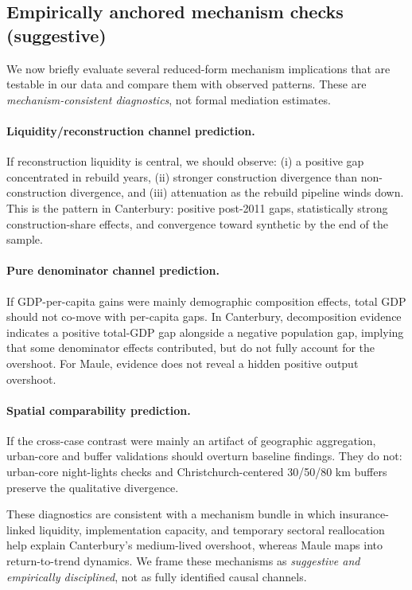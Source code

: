 \documentclass[12pt]{article}
\begin{document}
\subsection{Empirically anchored mechanism checks (suggestive)}

We now briefly evaluate several reduced-form mechanism implications that are testable in our data and compare them with observed patterns. These are \emph{mechanism-consistent diagnostics}, not formal mediation estimates.

\paragraph{Liquidity/reconstruction channel prediction.}
If reconstruction liquidity is central, we should observe: (i) a positive gap concentrated in rebuild years, (ii) stronger construction divergence than non-construction divergence, and (iii) attenuation as the rebuild pipeline winds down. This is the pattern in Canterbury: positive post-2011 gaps, statistically strong construction-share effects, and convergence toward synthetic by the end of the sample.

\paragraph{Pure denominator channel prediction.}
If GDP-per-capita gains were mainly demographic composition effects, total GDP should not co-move with per-capita gaps. In Canterbury, decomposition evidence indicates a positive total-GDP gap alongside a negative population gap, implying that some denominator effects contributed, but do not fully account for the overshoot. For Maule, evidence does not reveal a hidden positive output overshoot.

\paragraph{Spatial comparability prediction.}
If the cross-case contrast were mainly an artifact of geographic aggregation, urban-core and buffer validations should overturn baseline findings. They do not: urban-core night-lights checks and Christchurch-centered 30/50/80 km buffers preserve the qualitative divergence.

These diagnostics are consistent with a mechanism bundle in which insurance-linked liquidity, implementation capacity, and temporary sectoral reallocation help explain Canterbury's medium-lived overshoot, whereas Maule maps into return-to-trend dynamics. We frame these mechanisms as \emph{suggestive and empirically disciplined}, not as fully identified causal channels.
\end{document}
